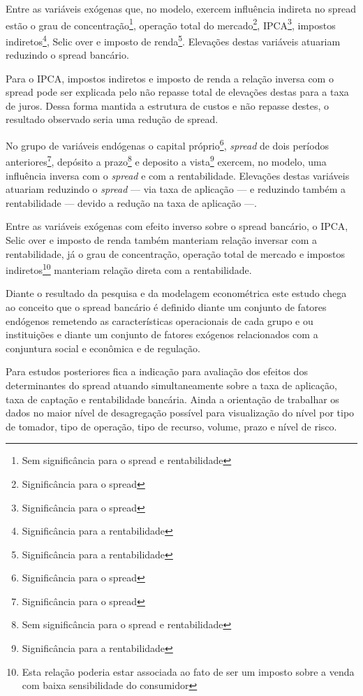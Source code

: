 \documentclass[
  12pt,
  12pt,
  openright,
  oneside,
  a4paper,
  chapter=TITLE,
  section=TITLE,
  subsection=TITLE,
  subsubsection=TITLE,
  english,
  portugues,
  sumario=tradicional]{abntex2}
\begin{document}
Entre as variáveis exógenas que, no modelo, exercem influência indireta no spread estão o grau de concentração\footnote{Sem significância para o spread e rentabilidade}, operação total do mercado\footnote{Significância para o spread}, IPCA\footnote{Significância para o spread}, impostos indiretos\footnote{Significância para a rentabilidade}, Selic over e imposto de renda\footnote{Significância para a rentabilidade}. Elevações destas variáveis atuariam reduzindo o spread bancário.

Para o IPCA, impostos indiretos e imposto de renda a relação inversa com o spread pode ser explicada pelo não repasse total de elevações destas para a taxa de juros. Dessa forma mantida a estrutura de custos e não repasse destes, o resultado observado seria uma redução de spread.

No grupo de variáveis endógenas o capital próprio\footnote{Significância para o spread}, \emph{spread} de dois períodos anteriores\footnote{Significância para o spread}, depósito a prazo\footnote{Sem significância para o spread e rentabilidade} e deposito a vista\footnote{Significância para a rentabilidade} exercem, no modelo, uma influência inversa com o \emph{spread} e com a rentabilidade. Elevações destas variáveis atuariam reduzindo o \emph{spread} --- via taxa de aplicação --- e reduzindo também a rentabilidade --- devido a redução na taxa de aplicação ---.

Entre as variáveis exógenas com efeito inverso sobre o spread bancário, o IPCA, Selic over e imposto de renda também manteriam relação inversar com a rentabilidade, já o grau de concentração, operação total de mercado e impostos indiretos\footnote{Esta relação poderia estar associada ao fato de ser um imposto sobre a venda com baixa sensibilidade do consumidor} manteriam relação direta com a rentabilidade.

Diante o resultado da pesquisa e da modelagem econométrica este estudo chega ao conceito que o spread bancário é definido diante um conjunto de fatores endógenos remetendo as características operacionais de cada grupo e ou instituições e diante um conjunto de fatores exógenos relacionados com a conjuntura social e econômica e de regulação.

Para estudos posteriores fica a indicação para avaliação dos efeitos dos determinantes do spread atuando simultaneamente sobre a taxa de aplicação, taxa de captação e rentabilidade bancária. Ainda a orientação de trabalhar os dados no maior nível de desagregação possível para visualização do nível por tipo de tomador, tipo de operação, tipo de recurso, volume, prazo e nível de risco.
\end{document}
